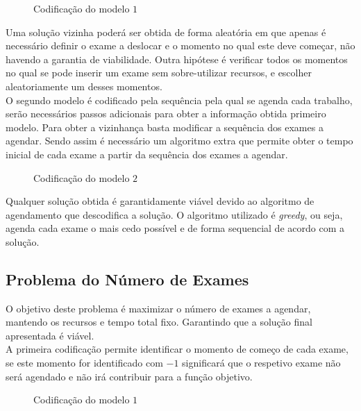 \begin{figure}[h]
	\centering
	\makebox[\textwidth][c]{%
		\texttt{[image: P1M1]}
	}
	\caption{Codificação do modelo $1$}
	\label{fig:cod_prob1_mod1}
\end{figure}

Uma solução vizinha poderá ser obtida de forma aleatória em que apenas é necessário definir o exame a deslocar e o momento no qual este deve começar, não havendo a garantia de viabilidade. Outra hipótese é verificar todos os momentos no qual se pode inserir um exame sem sobre-utilizar recursos, e escolher aleatoriamente um desses momentos.\\

O segundo modelo é codificado pela sequência pela qual se agenda cada trabalho, serão necessários passos adicionais para obter a informação obtida primeiro modelo. Para obter a vizinhança basta modificar a sequência dos exames a agendar. Sendo assim é necessário um algoritmo extra que permite obter o tempo inicial de cada exame a partir da sequência dos exames a agendar.\\

\begin{figure}[h]
	\centering
	\makebox[\textwidth][c]{%
		\texttt{[image: P1M2]}
	}
	\caption{Codificação do modelo $2$}
	\label{fig:cod_prob1_mod2}
\end{figure}

Qualquer solução obtida é garantidamente viável devido ao algoritmo de agendamento que descodifica a solução. O algoritmo utilizado é \textit{greedy}, ou seja, agenda cada exame o mais cedo possível e de forma sequencial de acordo com a solução.

\subsection{Problema do Número de Exames}

O objetivo deste problema é maximizar o número de exames a agendar, mantendo os recursos e tempo total fixo. Garantindo que a solução final apresentada é viável.\\

A primeira codificação permite identificar o momento de começo de cada exame, se este momento for identificado com $-1$ significará que o respetivo exame não será agendado e não irá contribuir para a função objetivo.\\

\begin{figure}[h]
    \centering
    \makebox[\textwidth][c]{%
        \texttt{[image: P2M1]}
    }
    \caption{Codificação do modelo $1$}
    \label{fig:cod_prob2_mod1}
\end{figure}

